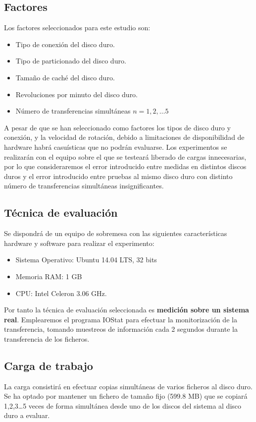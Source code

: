 \documentclass[a4paper,10pt]{article}
\begin{document}
\subsection{Factores}
Los factores seleccionados para este estudio son:
\begin{itemize}
 \item Tipo de conexión del disco duro.
 \item Tipo de particionado del disco duro.
 \item Tamaño de caché del disco duro.
 \item Revoluciones por minuto del disco duro.
 \item Número de transferencias simultáneas $n=1,2,\ldots5$
\end{itemize}
 A pesar de que se han seleccionado como factores los tipos de disco duro y conexión, y la velocidad de rotación, debido a 
 limitaciones de disponibilidad de hardware habrá casuísticas que no podrán evaluarse. Los
 experimentos se realizarán con el equipo sobre el que se testeará liberado de cargas innecesarias, por lo que consideraremos
 el error introducido entre medidas en distintos discos duros y el error introducido entre pruebas al mismo disco duro con distinto
 número de transferencias simultáneas insignificantes.
 
 \subsection{Técnica de evaluación}
 Se dispondrá de un equipo de sobremesa con las siguientes características hardware y software para realizar el experimento:
 \begin{itemize}
  \item Sistema Operativo: Ubuntu 14.04 LTS, 32 bits
  \item Memoria RAM: 1 GB
  \item CPU: Intel Celeron 3.06 GHz.
 \end{itemize}
 Por tanto la técnica de evaluación seleccionada es \textbf{medición sobre un sistema real}. Emplearemos el programa
 IOStat para efectuar la monitorización de la transferencia, tomando muestreos de información cada 2 segundos durante
 la transferencia de los ficheros.

 \subsection{Carga de trabajo}
 La carga consistirá en efectuar copias simultáneas de varios ficheros al disco duro. Se ha optado por mantener
 un fichero de tamaño fijo (599.8 MB) que se copiará 1,2,3\ldots 5 veces de forma simultánea desde uno de los discos
 del sistema al disco duro a evaluar.%
 
\end{document}
